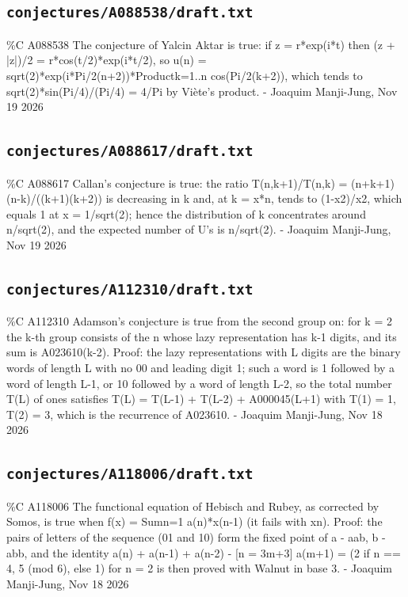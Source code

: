 \subsection*{\texttt{conjectures/A088538/draft.txt}}
{\small\raggedright\ttfamily
\%C A088538 The conjecture of Yalcin Aktar is true: if z = r*exp(i*t) then (z + |z|)/2 = r*cos(t/2)*exp(i*t/2), so u(n) = sqrt(2)*exp(i*Pi/2(n+2))*Productk=1..n cos(Pi/2(k+2)), which tends to sqrt(2)*sin(Pi/4)/(Pi/4) = 4/Pi by Viète's product. - Joaquim Manji-Jung, Nov 19 2026\par
}
\subsection*{\texttt{conjectures/A088617/draft.txt}}
{\small\raggedright\ttfamily
\%C A088617 Callan's conjecture is true: the ratio T(n,k+1)/T(n,k) = (n+k+1)(n-k)/((k+1)(k+2)) is decreasing in k and, at k = x*n, tends to (1-x2)/x2, which equals 1 at x = 1/sqrt(2); hence the distribution of k concentrates around n/sqrt(2), and the expected number of U's is  n/sqrt(2). - Joaquim Manji-Jung, Nov 19 2026\par
}
\subsection*{\texttt{conjectures/A112310/draft.txt}}
{\small\raggedright\ttfamily
\%C A112310 Adamson's conjecture is true from the second group on: for k = 2 the k-th group consists of the n whose lazy representation has k-1 digits, and its sum is A023610(k-2). Proof: the lazy representations with L digits are the binary words of length L with no 00 and leading digit 1; such a word is 1 followed by a word of length L-1, or 10 followed by a word of length L-2, so the total number T(L) of ones satisfies T(L) = T(L-1) + T(L-2) + A000045(L+1) with T(1) = 1, T(2) = 3, which is the recurrence of A023610. - Joaquim Manji-Jung, Nov 18 2026\par
}
\subsection*{\texttt{conjectures/A118006/draft.txt}}
{\small\raggedright\ttfamily
\%C A118006 The functional equation of Hebisch and Rubey, as corrected by Somos, is true when f(x) = Sumn=1 a(n)*x(n-1) (it fails with xn). Proof: the pairs of letters of the sequence (01 and 10) form the fixed point of a - aab, b - abb, and the identity a(n) + a(n-1) + a(n-2) - [n = 3m+3] a(m+1) = (2 if n == 4, 5 (mod 6), else 1) for n = 2 is then proved with Walnut in base 3. - Joaquim Manji-Jung, Nov 18 2026\par
}
